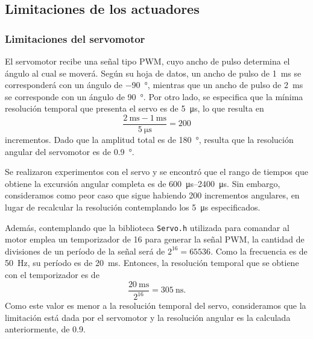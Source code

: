 \subsection{Limitaciones de los actuadores}

\subsubsection{Limitaciones del servomotor}

El servomotor recibe una señal tipo PWM, cuyo ancho de pulso determina el ángulo al cual se moverá. Según su hoja de datos, un ancho de pulso de \qty{1}{\ms} se corresponderá con un ángulo de \qty{-90}{\degree}, mientras que un ancho de pulso de \qty{2}{\ms} se corresponde con un ángulo de \qty{90}{\degree}. Por otro lado, se especifica que la mínima resolución temporal que presenta el servo es de \qty{5}{\us}, lo que resulta en
$$\frac{\qty{2}{\ms} - \qty{1}{\ms}}{\qty{5}{\us}} = 200$$
incrementos. Dado que la amplitud total es de \qty{180}{\degree}, resulta que la resolución angular del servomotor es de \qty{0.9}{\degree}.

Se realizaron experimentos con el servo y se encontró que el rango de tiempos que obtiene la excursión angular completa es de \qtyrange{600}{2400}{\us}. Sin embargo, consideramos como peor caso que sigue habiendo 200 incrementos angulares, en lugar de recalcular la resolución contemplando los \qty{5}{\us} especificados.

Además, contemplando que la biblioteca \verb|Servo.h| utilizada para comandar al motor emplea un temporizador de \qty{16}{\bit} para generar la señal PWM, la cantidad de divisiones de un período de la señal será de $2^{16} = 65536$. Como la frecuencia es de \qty{50}{\Hz}, su período es de \qty{20}{\ms}. Entonces, la resolución temporal que se obtiene con el temporizador es de
$$\frac{\qty{20}{\ms}}{2^{16}} = \qty{305}{\ns}.$$
Como este valor es menor a la resolución temporal del servo, consideramos que la limitación está dada por el servomotor y la resolución angular es la calculada anteriormente, de \qty{0.9}{\deg}.


